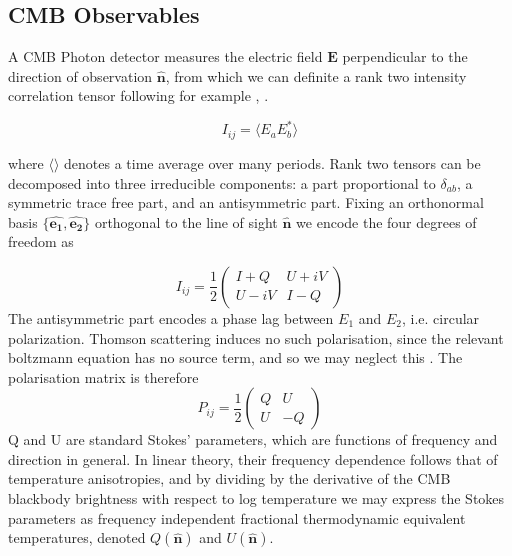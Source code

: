 \documentclass[a4paper,10pt]{article}
\renewcommand{\v}[1]{\mathbf{#1}}
\newcommand{\half}{\frac{1}{2}}
\newcommand{\unit}[1]{\hat{\v{#1}}}
\begin{document}
\subsection{CMB Observables}

A CMB Photon detector measures the electric field $\v{E}$ perpendicular to the direction of observation $\hat{\v{n}}$, from which we can definite a rank two intensity correlation tensor following for example \cite{baldauf}, \cite{lewis}.

\begin{equation}
I_{ij} = \langle E_aE_b^* \rangle
\end{equation}

where $\langle\rangle$ denotes a time average over many periods. Rank two tensors can be decomposed into three irreducible components: a part proportional to $\delta_{ab}$, a symmetric trace free part, and an antisymmetric part.  Fixing an orthonormal basis $\{\unit{e_1},\unit{e_2}\}$ orthogonal to the line of sight $\unit{n}$ we encode the four degrees of freedom as 


\begin{equation}
I_{ij} =
\half\begin{pmatrix}
I+Q & U+iV\\ 
U-iV & I-Q
\end{pmatrix}
\end{equation}
The antisymmetric part encodes a phase lag between $E_1$ and $E_2$, i.e. circular polarization. Thomson scattering induces no such polarisation, since the relevant boltzmann equation has no source term, and so we may neglect this \cite{Kowosky}. The polarisation matrix is therefore 
\begin{equation}
P_{ij} =\half \begin{pmatrix}
Q & U\\ 
U & -Q
\end{pmatrix}
\end{equation}
Q and U are standard Stokes' parameters, which are functions of frequency and direction in general. In linear theory, their frequency dependence follows that of temperature anisotropies, and by dividing by the derivative of the CMB blackbody brightness with respect to log temperature we may express the Stokes parameters as frequency independent fractional thermodynamic equivalent temperatures, denoted $Q(\unit{n})$ and $U(\unit{n})$.\\
\end{document}
